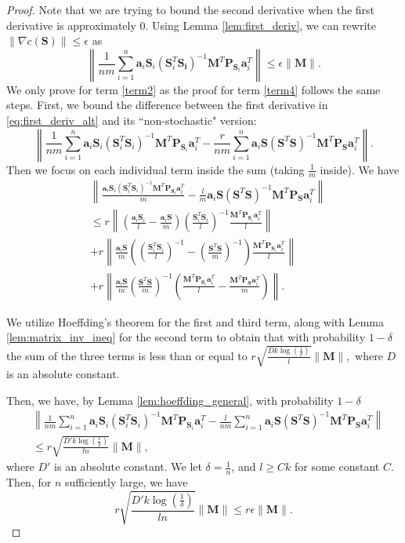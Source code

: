 \documentclass[twoside,11pt]{article}
\begin{document}
\begin{proof}
	Note that we are trying to bound the second derivative when the first derivative is approximately 0. Using Lemma \ref{lem:first_deriv}, we can rewrite $\|\nabla c(\bm{S})\|\leq \epsilon$ as
	\begin{equation}
	\left\|\frac{1}{nm}\sum_{i=1}^n \bm{a}_i\bm{S}_i(\bm{S}_i^T\bm{S_i})^{-1}\bm{M}^T\bm{P}_{\bm{S}_i} \bm{a}_i^T\right\|\leq \epsilon\|\bm{M}\|. \label{eq:first_deriv_alt}
	\end{equation}
	We  only prove for term \ref{term2} as the  proof for  term \ref{term4} follows the same steps. First, we 
	bound the difference between the first derivative in \eqref{eq:first_deriv_alt} and its ``non-stochastic" version:
	\begin{equation}
	\left\|\frac{1}{nm} \sum_{i=1}^n \bm{a}_i\bm{S}_i(\bm{S}_i^T\bm{S}_i)^{-1}\bm{M}^T\bm{P}_{\bm{S}_i}\bm{a}_i^T -\frac{r}{nm} \sum_{i=1}^n \bm{a}_i\bm{S}(\bm{S}^T\bm{S})^{-1}\bm{M}^T\bm{P}_{\bm{S}}\bm{a}_i^T\right\|. \label{eq:first_deriv_diff}
	\end{equation}
	Then we focus on each individual term inside the sum (taking $\frac{1}{m}$ inside). We have
	\begin{align*}
	&\left\|\frac{\bm{a}_i\bm{S}_i(\bm{S}_i^T\bm{S}_i)^{-1}\bm{M}^T\bm{P}_{\bm{S}_i}\bm{a}_i^T}{m}-\frac{l}{m}\bm{a}_i\bm{S}(\bm{S}^T\bm{S})^{-1}\bm{M}^T\bm{P}_{\bm{S}}\bm{a}_i^T\right\|\\&\leq r\left\|\left(\frac{\bm{a}_i\bm{S}_i}{l}-\frac{\bm{a}_i\bm{S}}{m}\right)\left(\frac{\bm{S}_i^T\bm{S}_i}{l}\right)^{-1}\frac{\bm{M}^T\bm{P}_{\bm{S}_i}\bm{a}_i^T}{l}\right\|\\&+r\left\|\frac{\bm{a}_i\bm{S}}{m}\left(\left(\frac{\bm{S}_i^T\bm{S}_i}{l}\right)^{-1}-\left(\frac{\bm{S}^T\bm{S}}{m}\right)^{-1}\right)\frac{\bm{M}^T\bm{P}_{\bm{S}_i}\bm{a}_i^T}{l}\right\|\\&+r\left\|\frac{\bm{a}_i\bm{S}}{m}\left(\frac{\bm{S}^T\bm{S}}{m}\right)^{-1}\left(\frac{\bm{M}^T\bm{P}_{\bm{S}_i}\bm{a}_i^T}{l}-\frac{\bm{M}^T\bm{P}_{\bm{S}}\bm{a}_i^T}{m}\right)\right\|.
	\end{align*}
	
	We  utilize Hoeffding's theorem for the first and third term, along with Lemma \ref{lem:matrix_inv_ineq} for the second term to obtain 
	that with probability $1-\delta$
	the sum of the three terms is less than or equal to $r\sqrt{\frac{D k\log(\frac{1}{\delta})}{l}}\|\bm{M}\|,$
	where $D$ is an absolute  constant. 
	
	
	Then, we have, by Lemma \ref{lem:hoeffding_general}, with probability $1-\delta$
	\begin{align*}
	&\left\|\frac{1}{nm} \sum_{i=1}^n \bm{a}_i\bm{S}_i(\bm{S}_i^T\bm{S}_i)^{-1}\bm{M}^T\bm{P}_{\bm{S}_i}\bm{a}_i^T -\frac{l}{nm} \sum_{i=1}^n \bm{a}_i\bm{S}(\bm{S}^T\bm{S})^{-1}\bm{M}^T\bm{P}_{\bm{S}}\bm{a}_i^T\right\|\\&\leq r\sqrt{\frac{D' k\log(\frac{1}{\delta})}{ln}}\|\bm{M}\|,
	\end{align*}
	where $D'$ is an absolute  constant. 
	We let  $\delta =\frac{1}{n}$, and $l\geq Ck$ for some constant $C$. Then, for $n$ sufficiently large, we have
	$$r\sqrt{\frac{D' k\log(\frac{1}{\delta})}{ln}}\|\bm{M}\| \leq r\epsilon \|\bm{M}\|.$$
	

\end{proof}
\end{document}
